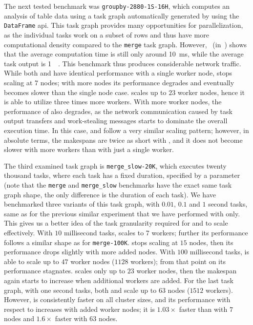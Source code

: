 The next tested benchmark was \texttt{groupby-2880-1S-16H}, which computes an analysis of table data
using a task graph automatically generated by \dask{} using the
\texttt{DataFrame} \gls{api}. This task graph provides many
opportunities for parallelization, as the individual tasks work on a subset of rows and thus have
more computational density compared to the \texttt{merge} task graph.
However,~ (in~) shows that the average computation time is still only around
\SI{10}{\milli\second}, while the average task output is \SI{1}{\mebi\byte}. This
benchmark thus produces considerable network traffic. While both \dask{} and
\rsds{} have identical performance with a single worker node,
\dask{} stops scaling at $7$ nodes; with more nodes its
performance degrades and eventually becomes slower than the single node case.
\rsds{} scales up to $23$ worker nodes, hence it is able
to utilize three times more workers. With more worker nodes, the performance of
\rsds{} also degrades, as the network communication caused by task output
transfers and work-stealing messages starts to dominate the overall execution time. In this case,
\dask{} and \rsds{} follow a very similar scaling pattern;
however, in absolute terms, the makespans are twice as short with \rsds{}, and
it does not become slower with more workers than with just a single worker.

The third examined task graph is \texttt{merge\_slow-20K}, which executes twenty thousand tasks,
where each task has a fixed duration, specified by a parameter (note that the
\texttt{merge} and \texttt{merge\_slow} benchmarks have the exact same task
graph shape, the only difference is the duration of each task). We have benchmarked three variants
of this task graph, with $0.01$, $0.1$ and
$1$ second tasks, same as for the previous similar experiment that we have
performed with \dask{} only. This gives us a better idea of the task
granularity required for \dask{} and \rsds{} to scale
effectively. With $10$ millisecond tasks, \dask{} scales
to $7$ workers; further its performance follows a similar shape as for
\texttt{merge-100K}. \rsds{} stops scaling at
$15$ nodes, then its performance drops slightly with more added nodes. With
$100$ millisecond tasks, \rsds{} is able to scale up to
$47$ worker nodes ($1128$ workers); from that point on
its performance stagnates. \dask{} scales only up to $23$
worker nodes, then the makespan again starts to increase when additional workers are added. For the
last task graph, with one second tasks, both \rsds{} and
\dask{} scale up to $63$ nodes
($1512$ workers). However, \rsds{} is consistently faster
on all cluster sizes, and its performance with respect to \dask{} increases
with added worker nodes; it is $1.03\times$ faster than \dask{}
with $7$ nodes and $1.6\times$ faster with
$63$ nodes.

